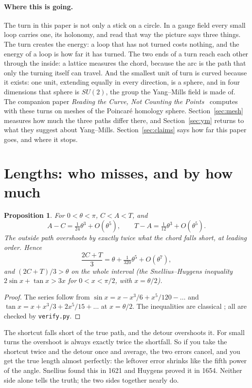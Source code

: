 \documentclass[11pt]{article}
\newtheorem{proposition}{Proposition}
\begin{document}
\paragraph{Where this is going.} The turn in this paper is not only a stick on a circle. In
a gauge field every small loop carries one, its holonomy, and read that way the picture
says three things. The turn creates the energy: a loop that has not turned costs nothing,
and the energy of a loop is how far it has turned. The two ends of a turn reach each other
through the inside: a lattice measures the chord, because the arc is the path that only
the turning itself can travel. And the smallest unit of turn is curved because it exists:
one unit, extending equally in every direction, is a sphere, and in four dimensions that
sphere is $SU(2)$, the group the Yang--Mills field is made of. The companion paper
\emph{Reading the Curve, Not Counting the Points}~\cite{davis-rtc} computes with these turns
on meshes of the Poincar\'e homology sphere. Section~\ref{sec:mesh} measures how much the
three paths differ there, and Section~\ref{sec:ym} returns to what they suggest about
Yang--Mills. Section~\ref{sec:claims} says how far this paper goes, and where it stops.

\section{Lengths: who misses, and by how much}\label{sec:lengths}

\begin{proposition}\label{prop:lengths}
For $0<\theta<\pi$, $C<A<T$, and
\[
A-C=\tfrac{1}{24}\theta^3+O(\theta^5),\qquad T-A=\tfrac{1}{12}\theta^3+O(\theta^5).
\]
The outside path overshoots by exactly twice what the chord falls short, at leading order. Hence
\[
\frac{2C+T}{3}=\theta+\tfrac{1}{320}\theta^5+O(\theta^7),
\]
and $(2C+T)/3>\theta$ on the whole interval (the Snellius--Huygens inequality
$2\sin x+\tan x>3x$ for $0<x<\pi/2$, with $x=\theta/2$).
\end{proposition}
\begin{proof}
The series follow from $\sin x=x-x^3/6+x^5/120-\dots$ and $\tan x=x+x^3/3+2x^5/15+\dots$ at
$x=\theta/2$. The inequalities are classical \cite{archimedes,huygens}; all are checked by
\texttt{verify.py}.
\end{proof}

\begin{plain}
The shortcut falls short of the true path, and the detour overshoots it. For small turns
the overshoot is always exactly twice the shortfall. So if you take the shortcut twice and
the detour once and average, the two errors cancel, and you get the true length almost
perfectly: the leftover error shrinks like the fifth power of the angle. Snellius found
this in 1621 and Huygens proved it in 1654. Neither side alone tells the truth; the two
sides together nearly do.
\end{plain}
\end{document}
